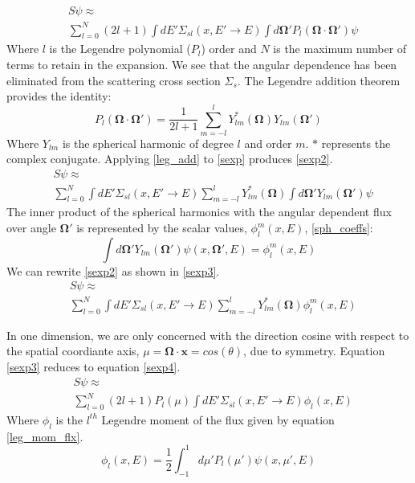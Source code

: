\begin{eqnarray}
& S\psi \approx \nonumber \\
& \sum_{l=0}^N (2l+1) \int dE' \Sigma_{sl}(x, E'\rightarrow E)
  \int d\mathbf\Omega' P_l(\mathbf\Omega \cdot \mathbf{\Omega'}) \psi
\label{sexp}
\end{eqnarray}
Where $l$ is the Legendre polynomial ($P_l$) order and $N$ is the maximum number of terms to retain in the expansion.  We see that the angular dependence has been eliminated from the scattering cross section $\Sigma_s$.
The Legendre addition theorem provides the identity:
\begin{equation}
P_l(\mathbf\Omega \cdot \mathbf{\Omega'}) = \frac{1}{2l+1}
\sum_{m=-l}^{l} Y^{*}_{lm}(\mathbf\Omega) Y_{lm}(\mathbf\Omega')
\label{leg_add}
\end{equation}
Where $Y_{lm}$ is the spherical harmonic of degree $l$ and order $m$.  $*$ represents the complex conjugate.  Applying \ref{leg_add} to \ref{sexp} produces \ref{sexp2}.
\begin{eqnarray}
& S\psi \approx \nonumber \\
& \sum_{l=0}^N \int dE' \Sigma_{sl}(x, E'\rightarrow E) \sum_{m=-l}^{l} Y^{*}_{lm}(\mathbf\Omega)
  \int d\mathbf\Omega' Y_{lm}(\mathbf\Omega') \psi
\label{sexp2}
\end{eqnarray}
The inner product of the spherical harmonics with the angular dependent flux over angle $\mathbf\Omega'$ is represented by the scalar values, $\phi_l^m(x, E)$, \ref{sph_coeffs}:
\begin{equation}
\int d\mathbf\Omega' Y_{lm}(\mathbf\Omega') \psi(x, \mathbf\Omega', E) = \phi_l^m(x, E)
\label{sph_coeffs}
\end{equation}
We can rewrite \ref{sexp2} as shown in \ref{sexp3}.
\begin{eqnarray}
& S\psi \approx \nonumber \\
& \sum_{l=0}^N \int dE' \Sigma_{sl}(x, E'\rightarrow E) \sum_{m=-l}^{l} Y^{*}_{lm}(\mathbf\Omega) \phi_l^m(x, E)
\label{sexp3}
\end{eqnarray}

In one dimension, we are only concerned with the direction cosine with respect to the spatial coordiante axis, $\mu=\mathbf\Omega \cdot \mathbf x=cos(\theta)$, due to symmetry.  Equation \ref{sexp3} reduces to equation \ref{sexp4}.
\begin{eqnarray}
& S\psi \approx \nonumber \\
& \sum_{l=0}^N (2l+1) P_l(\mu) \int dE' \Sigma_{sl}(x, E'\rightarrow E) \phi_l(x, E)
\label{sexp4}
\end{eqnarray}
Where $\phi_l$ is the $l^{th}$ Legendre moment of the flux given by equation \ref{leg_mom_flx}.
\begin{equation}
\phi_l(x,E) = \frac{1}{2} \int_{-1}^1 d\mu' P_l(\mu') \psi(x, \mu', E)
\label{leg_mom_flx}
\end{equation}

